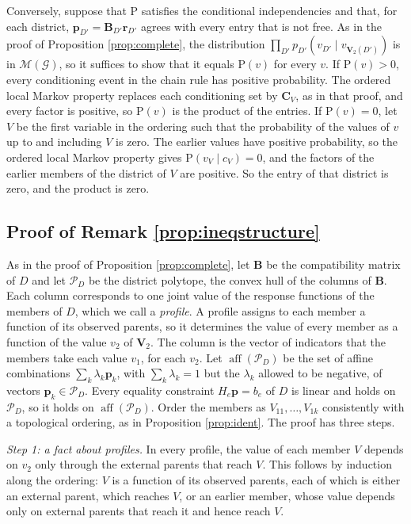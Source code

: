 \documentclass[12pt]{article}
\def\Pr{{\mathrm{P}}}
\newcommand{\bV}{\boldsymbol{V}}
\begin{document}
Conversely, suppose that $\Pr$ satisfies the conditional independencies and that, for each district, $\boldsymbol{p}_{D'} = \boldsymbol{B}_{D'} \boldsymbol{r}_{D'}$ agrees with every entry that is not free. As in the proof of Proposition \ref{prop:complete}, the distribution $\prod_{D'} p_{D'}(v_{D'} \mid v_{\bV_2(D')})$ is in $\mathcal{M}(\mathcal{G})$, so it suffices to show that it equals $\Pr(v)$ for every $v$. If $\Pr(v) > 0$, every conditioning event in the chain rule has positive probability. The ordered local Markov property replaces each conditioning set by $\boldsymbol{C}_V$, as in that proof, and every factor is positive, so $\Pr(v)$ is the product of the entries. If $\Pr(v) = 0$, let $V$ be the first variable in the ordering such that the probability of the values of $v$ up to and including $V$ is zero. The earlier values have positive probability, so the ordered local Markov property gives $\Pr(v_V \mid c_V) = 0$, and the factors of the earlier members of the district of $V$ are positive. So the entry of that district is zero, and the product is zero. 

\subsection*{Proof of Remark \ref{prop:ineqstructure}}

As in the proof of Proposition \ref{prop:complete}, let $\boldsymbol{B}$ be the compatibility matrix of $D$ and let $\mathcal{P}_D$ be the district polytope, the convex hull of the columns of $\boldsymbol{B}$. Each column corresponds to one joint value of the response functions of the members of $D$, which we call a \emph{profile}. A profile assigns to each member a function of its observed parents, so it determines the value of every member as a function of the value $v_2$ of $\bV_2$. The column is the vector of indicators that the members take each value $v_1$, for each $v_2$. Let $\operatorname{aff}(\mathcal{P}_D)$ be the set of affine combinations $\sum_k \lambda_k \boldsymbol{p}_k$, with $\sum_k \lambda_k = 1$ but the $\lambda_k$ allowed to be negative, of vectors $\boldsymbol{p}_k \in \mathcal{P}_D$. Every equality constraint $H_e \boldsymbol{p} = b_e$ of $D$ is linear and holds on $\mathcal{P}_D$, so it holds on $\operatorname{aff}(\mathcal{P}_D)$. Order the members as $V_{11}, \ldots, V_{1k}$ consistently with a topological ordering, as in Proposition \ref{prop:ident}. The proof has three steps.

\emph{Step 1: a fact about profiles.} In every profile, the value of each member $V$ depends on $v_2$ only through the external parents that reach $V$. This follows by induction along the ordering: $V$ is a function of its observed parents, each of which is either an external parent, which reaches $V$, or an earlier member, whose value depends only on external parents that reach it and hence reach $V$.
\end{document}
